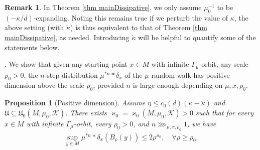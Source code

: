 \documentclass[11pt, leqno, fleqn]{amsart}
\def\cU{\mathfrak U}
\def\eps{\varepsilon}
\def \R{{\mathbb R}}
\newcommand{\cK}{{\mathcal K}}
\newcommand{\aryst}{\begin{eqnarray*}}
\newcommand{\earyst}{\end{eqnarray*}}
\newtheorem{prop}[thm]{\bf Proposition}
\theoremstyle{definition}
\newtheorem{rema}[thm]{\bf Remark}
\theoremstyle{definition}
\begin{document}
  
\begin{rema}In Theorem \ref{thm mainDissipative}, we only assume $\mu_{0}^{-1}$ to be $(-\kappa/d)$-expanding. Noting this remains true if we perturb the value of $\kappa$, the above setting (with $\check{\kappa}$) is thus equivalent to that of Theorem \ref{thm mainDissipative}, as needed. Introducing $\check{\kappa}$ will be helpful to quantify  some of the statements below.
\end{rema}
  

     
    
	
	
  
 
  \bigskip
  . We show that given any starting point $x\in M$ with infinite $\Gamma_{\mu}$-orbit, any scale $\rho_{0}>0$,  the $n$-step distribution $\mu^{*n}*\delta_{x}$ of the $\mu$-random walk has positive dimension above the scale $\rho_{0}$, provided $n$ is large enough depending on $\mu, x,\rho_{0}$. 
  
  
   \begin{prop}[Positive dimension] \label{prop step I} 
  Assume $\eta\leq c_{0}(d)(\kappa-\check{\kappa})$ and $\cU\subseteq \cU_{0}(M, \mu_{0}, \cK)$. 
  There exists $\varkappa_{0}=\varkappa_{0}( M,  \mu_{0}, \cK)>0$ such that for every $x \in M$ with infinite $\Gamma_{\mu}$-orbit, every $\rho_0>0$, and $n \ggg_{\mu, x, \rho_{0}} 1$, we have
\aryst
  \sup_{y \in M} \mu^{* n} * \delta_{x}(B_{\rho}(y)) \leq 2 \rho^{\varkappa_{0}}, \quad \forall \rho \geq \rho_0.
\earyst
  \end{prop}
  
\end{document}

